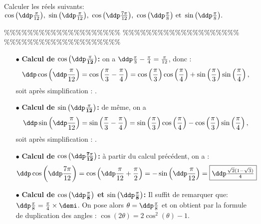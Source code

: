 



\begin{exercice}  \;
Calculer les r\'eels suivants: $\cos{\left(\ddp\frac{\pi}{12}\right)},\ \sin{\left(\ddp\frac{\pi}{12}\right)},\ \cos{\left(\ddp\frac{7\pi}{12}\right)},\ \cos{\left(\ddp\frac{\pi}{8}\right)}\ \hbox{et}\ \sin{\left(\ddp\frac{\pi}{8}\right)} .$
\end{exercice}


\%\%\%\%\%\%\%\%\%\%\%\%\%\%\%\%\%\%\%\%
\%\%\%\%\%\%\%\%\%\%\%\%\%\%\%\%\%\%\%\%
\%\%\%\%\%\%\%\%\%\%\%\%\%\%\%\%\%\%\%\%



\begin{correction}
\begin{itemize}
\item[$\bullet$] \textbf{Calcul de $\mathbf{\cos{\left(\ddp\frac{\pi}{12}\right)}}$:} on a $\ddp \frac{\pi}{3}-\frac{\pi}{4} = \frac{\pi}{12}$, donc :
$$\ddp \cos\left(\ddp\frac{\pi}{12}\right) = \cos\left(\frac{\pi}{3}-\frac{\pi}{4}\right) = \cos \left(\frac{\pi}{3}\right)\cos \left(\frac{\pi}{4}\right) + \sin \left(\frac{\pi}{3}\right)\sin \left(\frac{\pi}{4}\right),$$
soit apr\`es simplification : .
\item[$\bullet$] \textbf{Calcul de $\mathbf{\sin{\left(\ddp\frac{\pi}{12}\right)}}$:}  de m\^eme, on a 
$$\ddp \sin\left(\ddp\frac{\pi}{12}\right) = \sin\left(\frac{\pi}{3}-\frac{\pi}{4}\right) = \sin \left(\frac{\pi}{3}\right)\cos \left(\frac{\pi}{4}\right) - \cos \left(\frac{\pi}{3}\right)\sin \left(\frac{\pi}{4}\right),$$
soit apr\`es simplification : .
\item[$\bullet$] \textbf{Calcul de $\mathbf{\cos{\left(\ddp\frac{7\pi}{12}\right)}}$:} \`a partir du calcul pr\'ec\'edent, on a :
$$\ddp \cos{\left(\ddp\frac{7\pi}{12}\right)} = \cos{\left(\ddp\frac{\pi}{12}+\frac{\pi}{2}\right)} = -\sin{\left(\ddp\frac{\pi}{12}\right)} = \fbox{$\ddp \frac{\sqrt{2}(1-\sqrt{3})}{4}$}$$
\item[$\bullet$] \textbf{Calcul de $\mathbf{\cos{\left(\ddp\frac{\pi}{8}\right)}}$ et $\mathbf{\sin{\left(\ddp\frac{\pi}{8}\right)}}$:}  Il suffit de remarquer que: $\ddp\frac{\pi}{8}=\frac{\pi}{4}\times \demi$. On pose alors $\theta=\ddp\frac{\pi}{8}$ et on obtient par la formule de duplication des angles : $\cos{(2\theta)}=2\cos^2{(\theta)}-1.$

\end{itemize}
\end{correction}
